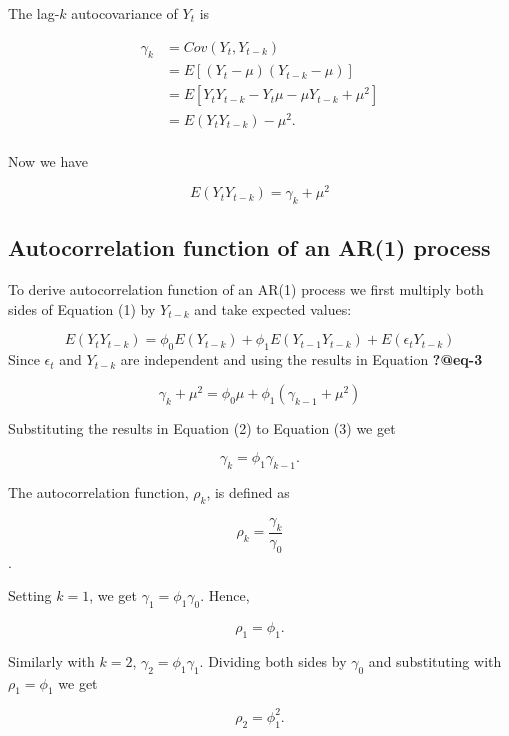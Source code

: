\documentclass[
  11pt,
  a4paper,
]{report}
\begin{document}
The lag-\(k\) autocovariance of \(Y_t\) is

\begin{equation}
\begin{aligned}
  \gamma_k &= Cov(Y_t, Y_{t-k}) \\
         &= E[(Y_t-\mu)(Y_{t-k}-\mu)] \\
         &= E[Y_tY_{t-k}-Y_t\mu-\mu Y_{t-k} +\mu^2] \\
         &= E(Y_t Y_{t-k}) - \mu^2. \\
\end{aligned}
\end{equation}

Now we have

\begin{equation}
  E(Y_t Y_{t-k}) = \gamma_k + \mu^2
\end{equation}

\subsection{Autocorrelation function of an AR(1)
process}\label{autocorrelation-function-of-an-ar1-process}

To derive autocorrelation function of an AR(1) process we first multiply
both sides of Equation (1) by \(Y_{t-k}\) and take expected values:

\[E(Y_tY_{t-k})=\phi_0E(Y_{t-k})+\phi_1 E(Y_{t-1}Y_{t-k})+E(\epsilon_tY_{t-k})\]
Since \(\epsilon_t\) and \(Y_{t-k}\) are independent and using the
results in Equation \textbf{?@eq-3}

\[\gamma_k + \mu^2 = \phi_0 \mu+\phi_1(\gamma_{k-1}+\mu^2)\]

Substituting the results in Equation (2) to Equation (3) we get

\begin{equation}
\gamma_k = \phi_1 \gamma_{k-1}.
\end{equation}

The autocorrelation function, \(\rho_k\), is defined as

\[\rho_k = \frac{\gamma_k}{\gamma_0}\].

Setting \(k=1\), we get \(\gamma_1 = \phi_1\gamma_0.\) Hence,

\[\rho_1=\phi_1.\]

Similarly with \(k=2\), \(\gamma_2 = \phi_1 \gamma_1\). Dividing both
sides by \(\gamma_0\) and substituting with \(\rho_1=\phi_1\) we get

\[\rho_2=\phi_1^2.\]
\end{document}
